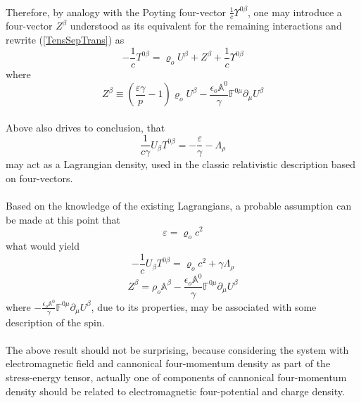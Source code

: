 \documentclass[aps,prx,preprint,groupedaddress,showkeys]{revtex4-2}
\begin{document}
~\\
Therefore, by analogy with the Poyting four-vector $\frac{1}{c}\Upsilon^{0 \beta}$, one may introduce a four-vector $Z^{\beta}$ understood as its equivalent for the remaining interactions and rewrite (\ref{TensSepTrans}) as
\begin{equation} \label{HQ4b}
- \frac{1}{c} T^{0 \beta} =  \varrho_o U^{\beta} + Z^{\beta} + \frac{1}{c}\Upsilon^{0 \beta}
\end{equation}
where
\begin{equation} \label{HQ4d}
Z^{\beta} \equiv \left (\frac{\varepsilon \gamma}{p} - 1 \right )  \varrho_o U^{\beta} - \frac{\epsilon_o \mathbb{A}^0}{\gamma} \mathbb{F}^{0 \mu} \partial_{\mu} U^{\beta}
\end{equation}
~\\
Above also drives to conclusion, that
\begin{equation} \label{LagDenH}
\frac{1}{c\gamma} U_{\beta} T^{0 \beta} = - \frac{\varepsilon}{\gamma} - \Lambda_{\rho}
\end{equation} 
may act as a Lagrangian density, used in the classic relativistic description based on four-vectors.\\
~\\
Based on the knowledge of the existing Lagrangians, a probable assumption can be made at this point that
\begin{equation} \label{HQ4e}
\varepsilon = \varrho_o c^2
\end{equation}
what would yield
\begin{equation} \label{LDR}
- \frac{1}{c} U_{\beta} T^{0 \beta} = \varrho_o c^2 + \gamma \Lambda_{\rho}
\end{equation} 
\begin{equation} \label{HQ4f}
Z^{\beta} = \rho_o \mathbb{A}^{\beta} - \frac{\epsilon_o \mathbb{A}^0}{\gamma} \mathbb{F}^{0 \mu} \partial_{\mu} U^{\beta}
\end{equation}
where $- \frac{\epsilon_o \mathbb{A}^0}{\gamma} \mathbb{F}^{0 \mu} \partial_{\mu} U^{\beta}$, due to its properties, may be associated with some description of the spin.\\
~\\
The above result should not be surprising, because considering the system with electromagnetic field and cannonical four-momentum density as part of the stress-energy tensor, actually one of components of cannonical four-momentum density should be related to electromagnetic four-potential and charge density.\\
\end{document}
